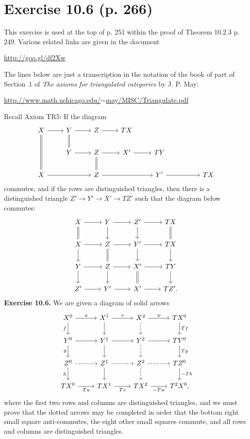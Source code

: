 \documentclass[12pt]{article}
\theoremstyle{remark}%
\newcommand{\n}{\noindent}
\begin{document}
\section{Exercise 10.6 (p. 266)}%
%
This exercise is used at the top of p. 251 within the proof of Theorem 10.2.3 p. 249. Various related links are given in the document\smallskip

\centerline{\href{http://goo.gl/df2Xw}{http://goo.gl/df2Xw}}

\n The lines below are just a transcription in the notation of the book of part of Section~1 of \emph{The axioms for triangulated categories} by J. P. May:\smallskip

\centerline{\href{http://www.math.uchicago.edu/~may/MISC/Triangulate.pdf}{http://www.math.uchicago.edu/$\sim$may/MISC/Triangulate.pdf}}

Recall Axiom TR5: If the diagram
$$
\begin{tikzcd}
X\ar[equal]{dd}\ar{r}&Y\ar[equal]{d}\ar{r}&Z\ar{r}&TX\\
&Y\ar{r}&Z\ar[equal]{d}\ar{r}&X'\ar{r}&TY\\
X\ar{rr}&&Z\ar{rr}&&Y'\ar{rr}&&TX
\end{tikzcd}
$$
commutes, and if the rows are distinguished triangles, then there is a distinguished triangle $Z'\to Y'\to X'\to TZ'$ such that the diagram below commutes:
$$
\begin{tikzcd}
X\ar{r}\ar[equal]{d}&Y\ar{d}\ar{r}&Z'\ar{d}\ar{r}&TX\ar[equal]{d}\\
X\ar{d}\ar{r}&Z\ar{r}\ar[equal]{d}&Y'\ar{d}\ar{r}&TX\ar{d}\\
Y\ar{d}\ar{r}&Z\ar{d}\ar{r}&X'\ar{r}\ar[equal]{d}&TY\ar{d}\\
Z'\ar{r}&Y'\ar{r}&X'\ar{r}&TZ'.
\end{tikzcd}
$$
\textbf{Exercise 10.6.} We are given a diagram of solid arrows 
$$
\begin{tikzcd}
X^0\ar{r}{u}\ar{d}[swap]{f}&X^1\ar{d}\ar{r}{v}&X^2\ar[dashed]{d}\ar{r}{w}&TX^0\ar{d}{Tf}\\ 
Y^0\ar{r}\ar{d}[swap]{g}&Y^1\ar{d}\ar{r}&Y^2\ar[dashed]{d}\ar{r}&TY^0\ar{d}{Tg}\\ 
Z^0\ar[dashed]{r}\ar{d}[swap]{h}&Z^1\ar{d}\ar[dashed]{r}&Z^2\ar[dashed]{d}\ar[dashed]{r}&TZ^0\ar{d}{-Th}\\ 
TX^0\ar{r}[swap]{Tu}&TX^1\ar{r}[swap]{Tv}&TX^2\ar{r}[swap]{-Tw}&T^2X^0,
\end{tikzcd}
$$
where the first two rows and columns are distinguished triangles, and we must prove that the dotted arrows may be completed in order that the bottom right small square anti-commutes, the eight other small squares commute, and all rows and columns are distinguished triangles.
\end{document}
